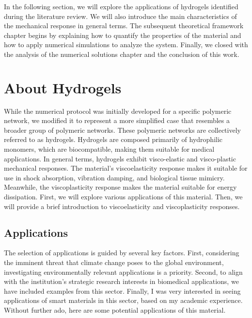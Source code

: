 In the following section, we will explore the applications of hydrogels identified during the literature review. 
We will also introduce the main characteristics of the mechanical response in general terms.
The subsequent theoretical framework chapter begins by explaining how to quantify the properties of the material and how to apply numerical simulations to analyze the system.
Finally, we closed with the analysis of the numerical solutions chapter and the conclusion of this work.

\section{About Hydrogels}

While the numerical protocol was initially developed for a specific polymeric network, we modified it to represent a more simplified case that resembles a broader group of polymeric networks.
These polymeric networks are collectively referred to as hydrogels.
Hydrogels are composed primarily of hydrophilic monomers, which are biocompatible, making them suitable for medical applications.
In general terms, hydrogels exhibit visco-elastic and visco-plastic mechanical responses.
The material's viscoelasticity response makes it suitable for use in shock absorption, vibration damping, and biological tissue mimicry.
Meanwhile, the viscoplasticity response makes the material suitable for energy dissipation.
First, we will explore various applications of this material.
Then, we will provide a brief introduction to viscoelasticity and viscoplasticity responses.

\subsection{Applications}

The selection of applications is guided by several key factors. 
First, considering the imminent threat that climate change poses to the global environment, investigating environmentally relevant applications is a priority.
Second, to align with the institution's strategic research interests in biomedical applications, we have included examples from this sector.
Finally, I was very interested in seeing applications of smart materials in this sector, based on my academic experience.
Without further ado, here are some potential applications of this material.

